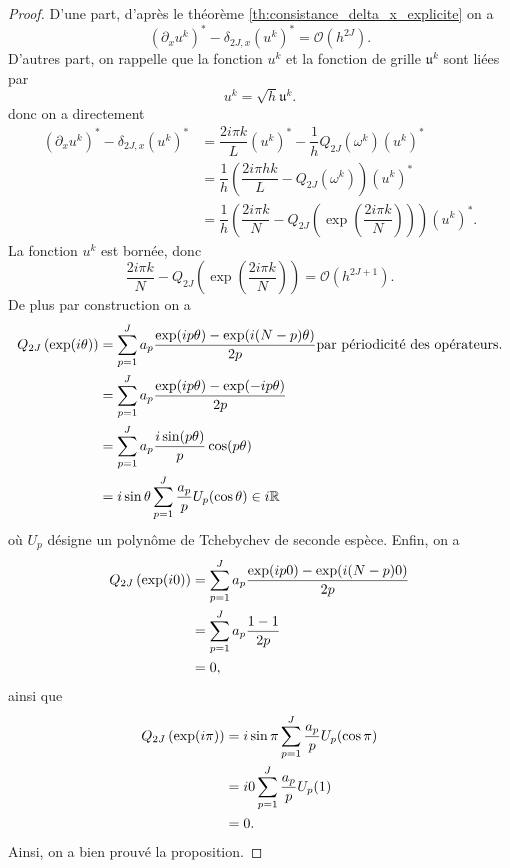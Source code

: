 \begin{proof}
D'une part, d'après le théorème \ref{th:consistance_delta_x_explicite} on a
\begin{equation}
(\partial_x u^k)^* - \delta_{2J,x}(u^k)^* = \mathcal{O}(h^{2J}).
\end{equation}
D'autres part, on rappelle que la fonction $u^k$ et la fonction de grille $\mathfrak{u}^k$ sont liées par
\begin{equation}
u^k = \sqrt{h} \mathfrak{u}^k.
\end{equation}
donc on a directement 
\begin{align*}
(\partial_x u^k)^* - \delta_{2J,x}(u^k)^* & = \dfrac{2 i \pi k}{L}(u^k)^* - \dfrac{1}{h}Q_{2J}(\omega^k) (u^k)^* \\
	& = \dfrac{1}{h} \left( \dfrac{2 i \pi h k}{L} - Q_{2J}(\omega^k) \right) (u^k)^*\\
	& = \dfrac{1}{h} \left( \dfrac{2 i \pi k}{N} - Q_{2J} \left( \exp \left( \dfrac{2 i \pi k}{N} \right) \right) \right) (u^k)^* .
\end{align*}
La fonction $u^k$ est bornée, donc
\begin{equation}
\dfrac{2 i \pi k}{N} - Q_{2J} \left( \exp \left( \dfrac{2 i \pi k}{N} \right) \right) = \mathcal{O}(h^{2J+1}).
\end{equation}
De plus par construction on a
\begin{align*}
Q_{2J} \left( \exp ( i \theta ) \right) & = \displaystyle\sum\limits_{p=1}^J a_p \dfrac{\exp ( i p \theta ) - \exp ( i (N-p) \theta )}{2 p} \text{par périodicité des opérateurs.} \\
	& = \displaystyle\sum\limits_{p=1}^J a_p \dfrac{\exp ( i p \theta ) - \exp ( -i p \theta )}{2 p} \\
	& = \displaystyle\sum\limits_{p=1}^J a_p \dfrac{i \sin (p \theta )}{p} \cos ( p \theta) \\
	& = i \sin \theta \displaystyle\sum\limits_{p=1}^J \dfrac{a_p}{p} U_p (\cos \theta) \in i \mathbb{R}
\end{align*}
où $U_p$ désigne un polynôme de Tchebychev de seconde espèce.
Enfin, on a
\begin{align*}
Q_{2J} \left( \exp ( i 0 ) \right) & = \displaystyle\sum\limits_{p=1}^J a_p \dfrac{\exp ( i p 0 ) - \exp ( i (N-p) 0 )}{2 p}\\
& = \displaystyle\sum\limits_{p=1}^J a_p \dfrac{1 - 1}{2 p}\\
& = 0,
\end{align*}
ainsi que 
\begin{align*}
Q_{2J} \left( \exp ( i \pi ) \right)& = i \sin \pi \displaystyle\sum\limits_{p=1}^J \dfrac{a_p}{p} U_p (\cos \pi) \\
	& = i 0 \displaystyle\sum\limits_{p=1}^J \dfrac{a_p}{p} U_p (1) \\
	& = 0.
\end{align*}
Ainsi, on a bien prouvé la proposition.
\end{proof}
